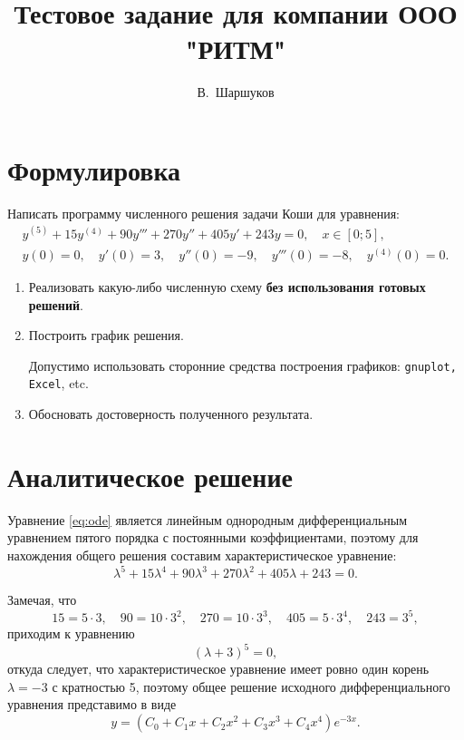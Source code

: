 \documentclass[a4paper,12pt]{article}
\title{Тестовое задание для компании ООО "РИТМ"}
\author{В.~Шаршуков}
\begin{document}
\maketitle
\pagebreak

\tableofcontents
\pagebreak

\section{Формулировка}

Написать программу численного решения задачи Коши для уравнения:
\begin{equation}\label{eq:ode}
    \begin{gathered}
        y^{(5)} + 15y^{(4)} + 90y''' + 270y'' + 405y' + 243y = 0,
            \quad x \in [0;5], \\
        y(0) = 0, \quad y'(0) = 3, \quad y''(0) = -9,
            \quad y'''(0) = -8, \quad y^{(4)}(0) = 0.
    \end{gathered}
\end{equation}

\begin{enumerate}
    \item Реализовать какую-либо численную схему
        \textbf{без использования готовых решений}.

    \item Построить график решения.

        Допустимо использовать сторонние средства построения графиков:
        \texttt{gnuplot, Excel}, etc.

    \item Обосновать достоверность полученного результата.
\end{enumerate}

\pagebreak

\section{Аналитическое решение}

Уравнение \ref{eq:ode} является линейным однородным дифференциальным уравнением
пятого порядка с постоянными коэффициентами, поэтому для нахождения общего
решения составим характеристическое уравнение:
\begin{equation*}
    \lambda^5 + 15 \lambda^4 + 90 \lambda^3 + 270 \lambda^2 + 405 \lambda
        + 243 = 0.
\end{equation*}

Замечая, что
\begin{equation*}
    15 = 5 \cdot 3, \quad 90 = 10 \cdot 3^2, \quad 270 = 10 \cdot 3^3,
        \quad 405 = 5 \cdot 3^4, \quad 243 = 3^5,
\end{equation*}
приходим к уравнению
\begin{equation*}
    (\lambda + 3)^5 = 0,
\end{equation*}
откуда следует, что характеристическое уравнение имеет ровно один корень
$\lambda = -3$ с кратностью 5, поэтому общее решение исходного дифференциального
уравнения представимо в виде
\begin{equation*}
    y = (C_0 + C_1 x + C_2 x^2 + C_3 x^3 + C_4 x^4) e^{-3x}.
\end{equation*}
\end{document}
